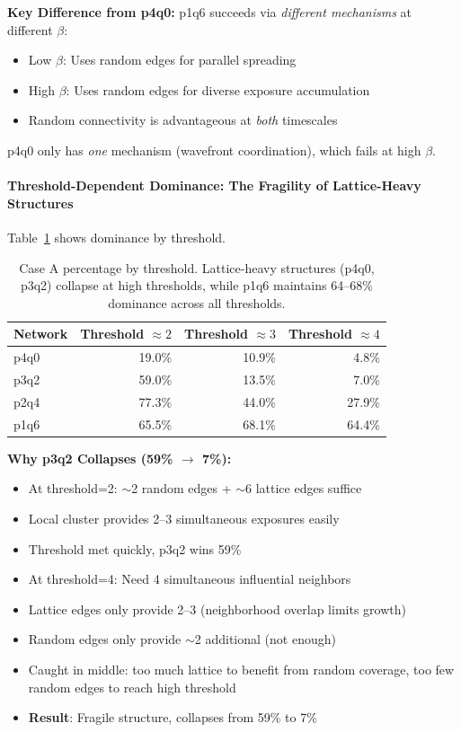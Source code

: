 \documentclass[12pt,a4paper]{article}
\begin{document}
\textbf{Key Difference from p4q0:}
p1q6 succeeds via \textit{different mechanisms} at different $\beta$:
\begin{itemize}
    \item Low $\beta$: Uses random edges for parallel spreading
    \item High $\beta$: Uses random edges for diverse exposure accumulation
    \item Random connectivity is advantageous at \textit{both} timescales
\end{itemize}

p4q0 only has \textit{one} mechanism (wavefront coordination), which fails at high $\beta$.

\paragraph{Threshold-Dependent Dominance: The Fragility of Lattice-Heavy Structures}

Table~\ref{tab:threshold_dominance} shows dominance by threshold.

\begin{table}[H]
\centering
\begin{tabular}{@{}lrrr@{}}
\toprule
\textbf{Network} & \textbf{Threshold $\approx 2$} & \textbf{Threshold $\approx 3$} & \textbf{Threshold $\approx 4$} \\
\midrule
p4q0 & 19.0\% & 10.9\% & 4.8\% \\
p3q2 & 59.0\% & 13.5\% & 7.0\% \\
p2q4 & 77.3\% & 44.0\% & 27.9\% \\
p1q6 & 65.5\% & 68.1\% & 64.4\% \\
\bottomrule
\end{tabular}
\caption{Case A percentage by threshold. Lattice-heavy structures (p4q0, p3q2) collapse at high thresholds, while p1q6 maintains 64--68\% dominance across all thresholds.}
\label{tab:threshold_dominance}
\end{table}

\textbf{Why p3q2 Collapses (59\% $\to$ 7\%):}
\begin{itemize}
    \item At threshold=2: $\sim$2 random edges + $\sim$6 lattice edges suffice
    \item Local cluster provides 2--3 simultaneous exposures easily
    \item Threshold met quickly, p3q2 wins 59\%
    \item At threshold=4: Need 4 simultaneous influential neighbors
    \item Lattice edges only provide 2--3 (neighborhood overlap limits growth)
    \item Random edges only provide $\sim$2 additional (not enough)
    \item Caught in middle: too much lattice to benefit from random coverage, too few random edges to reach high threshold
    \item \textbf{Result}: Fragile structure, collapses from 59\% to 7\%
\end{itemize}
\end{document}
